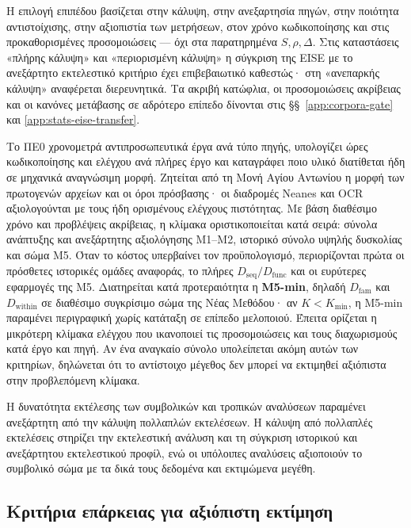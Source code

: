 \documentclass[11pt,a4paper]{article}
\begin{document}
Η επιλογή επιπέδου βασίζεται στην κάλυψη, στην ανεξαρτησία πηγών, στην ποιότητα αντιστοίχισης, στην αξιοπιστία των μετρήσεων, στον χρόνο κωδικοποίησης και στις προκαθορισμένες προσομοιώσεις --- όχι στα παρατηρημένα \(S,\rho,\Delta\). Στις καταστάσεις «πλήρης κάλυψη» και «περιορισμένη κάλυψη» η σύγκριση της EISE με το ανεξάρτητο εκτελεστικό κριτήριο έχει επιβεβαιωτικό καθεστώς· στη «ανεπαρκής κάλυψη» αναφέρεται διερευνητικά. Τα ακριβή κατώφλια, οι προσομοιώσεις ακρίβειας και οι κανόνες μετάβασης σε αδρότερο επίπεδο δίνονται στις §§~\ref{app:corpora-gate} και \ref{app:stats-eise-transfer}.

Το ΠΕ0 χρονομετρά αντιπροσωπευτικά έργα ανά τύπο πηγής, υπολογίζει ώρες κωδικοποίησης και ελέγχου ανά πλήρες έργο και καταγράφει ποιο υλικό διατίθεται ήδη σε μηχανικά αναγνώσιμη μορφή. Ζητείται από τη Μονή Αγίου Αντωνίου η μορφή των πρωτογενών αρχείων και οι όροι πρόσβασης· οι διαδρομές Neanes και OCR αξιολογούνται με τους ήδη ορισμένους ελέγχους πιστότητας. Με βάση διαθέσιμο χρόνο και προβλέψεις ακρίβειας, η κλίμακα οριστικοποιείται κατά σειρά: σύνολα ανάπτυξης και ανεξάρτητης αξιολόγησης M1--M2, ιστορικό σύνολο υψηλής δυσκολίας και σώμα M5. Όταν το κόστος υπερβαίνει τον προϋπολογισμό, περιορίζονται πρώτα οι πρόσθετες ιστορικές ομάδες αναφοράς, το πλήρες $D_{\mathrm{seq}}/D_{\mathrm{func}}$ και οι ευρύτερες εφαρμογές της M5. Διατηρείται κατά προτεραιότητα η \textbf{M5-min}, δηλαδή $D_{\mathrm{fam}}$ και $D_{\mathrm{within}}$ σε διαθέσιμο συγκρίσιμο σώμα της Νέας Μεθόδου· αν $K<K_{\min}$, η M5-min παραμένει περιγραφική χωρίς κατάταξη σε επίπεδο μελοποιού. Έπειτα ορίζεται η μικρότερη κλίμακα ελέγχου που ικανοποιεί τις προσομοιώσεις και τους διαχωρισμούς κατά έργο και πηγή. Αν ένα αναγκαίο σύνολο υπολείπεται ακόμη αυτών των κριτηρίων, δηλώνεται ότι το αντίστοιχο μέγεθος δεν μπορεί να εκτιμηθεί αξιόπιστα στην προβλεπόμενη κλίμακα.\par

Η δυνατότητα εκτέλεσης των συμβολικών και τροπικών αναλύσεων παραμένει ανεξάρτητη από την κάλυψη πολλαπλών εκτελέσεων. Η κάλυψη από πολλαπλές εκτελέσεις στηρίζει την εκτελεστική ανάλυση και τη σύγκριση ιστορικού και ανεξάρτητου εκτελεστικού προφίλ, ενώ οι υπόλοιπες αναλύσεις αξιοποιούν το συμβολικό σώμα με τα δικά τους δεδομένα και εκτιμώμενα μεγέθη.

\subsection{Κριτήρια επάρκειας για αξιόπιστη εκτίμηση}\label{sec:estimability}
\end{document}
